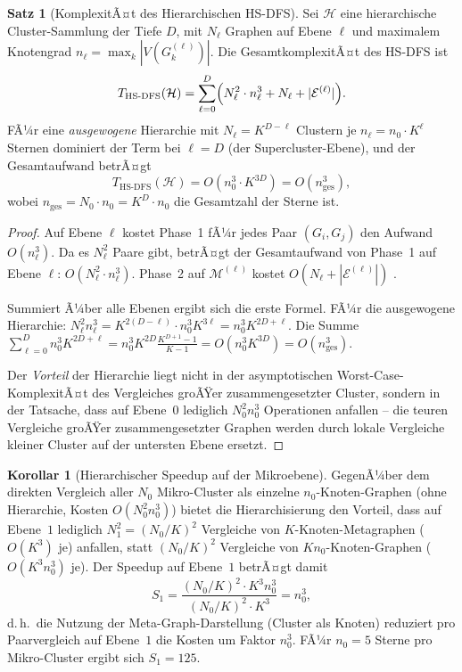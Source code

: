 ﻿\documentclass[a4paper,12pt]{report}
\theoremstyle{definition}
\newtheorem{satz}{Satz}
\newtheorem{korollar}{Korollar}
\begin{document}
\begin{satz}[KomplexitÃ¤t des Hierarchischen HS-DFS]
\label{satz:hsdfs_komplexitaet}
Sei $\mathcal{H}$ eine hierarchische Cluster-Sammlung der Tiefe $D$, mit $N_\ell$ Graphen auf Ebene $\ell$ und maximalem Knotengrad $n_\ell = \max_k |V(G^{(\ell)}_k)|$. Die GesamtkomplexitÃ¤t des HS-DFS ist
\[
T_\mathrm{HS\text{-}DFS}(\mathcal{H}) = \sum_{\ell=0}^{D}
\Bigl( N_\ell^2 \cdot n_\ell^3 + N_\ell + |\mathcal{E}^{(\ell)}| \Bigr).
\]
FÃ¼r eine \emph{ausgewogene} Hierarchie mit $N_\ell = K^{D-\ell}$ Clustern je $n_\ell = n_0 \cdot K^\ell$ Sternen dominiert der Term bei $\ell = D$ (der Supercluster-Ebene), und der Gesamtaufwand betrÃ¤gt
\[
T_\mathrm{HS\text{-}DFS}(\mathcal{H}) = O\!\left(n_0^3 \cdot K^{3D}\right) = O\!\left(n_\mathrm{ges}^3\right),
\]
wobei $n_\mathrm{ges} = N_0 \cdot n_0 = K^D \cdot n_0$ die Gesamtzahl der Sterne ist.
\end{satz}

\begin{proof}
Auf Ebene $\ell$ kostet Phase~1 fÃ¼r jedes Paar $(G_i, G_j)$ den Aufwand $O(n_\ell^3)$. Da es $N_\ell^2$ Paare gibt, betrÃ¤gt der Gesamtaufwand von Phase~1 auf Ebene $\ell$: $O(N_\ell^2 \cdot n_\ell^3)$. Phase~2 auf $\mathcal{M}^{(\ell)}$ kostet $O(N_\ell + |\mathcal{E}^{(\ell)}|)$ \cite{cormen2009}.

Summiert Ã¼ber alle Ebenen ergibt sich die erste Formel. FÃ¼r die ausgewogene Hierarchie: $N_\ell^2 n_\ell^3 = K^{2(D-\ell)} \cdot n_0^3 K^{3\ell} = n_0^3 K^{2D+\ell}$. Die Summe $\sum_{\ell=0}^D n_0^3 K^{2D+\ell} = n_0^3 K^{2D} \frac{K^{D+1}-1}{K-1} = O(n_0^3 K^{3D}) = O(n_\mathrm{ges}^3)$.

Der \emph{Vorteil} der Hierarchie liegt nicht in der asymptotischen Worst-Case-KomplexitÃ¤t des Vergleiches groÃŸer zusammengesetzter Cluster, sondern in der Tatsache, dass auf Ebene~$0$ lediglich $N_0^2 n_0^3$ Operationen anfallen -- die teuren Vergleiche groÃŸer zusammengesetzter Graphen werden durch lokale Vergleiche kleiner Cluster auf der untersten Ebene ersetzt.
\end{proof}

\begin{korollar}[Hierarchischer Speedup auf der Mikroebene]
\label{kor:speedup}
GegenÃ¼ber dem direkten Vergleich aller $N_0$ Mikro-Cluster als einzelne $n_0$-Knoten-Graphen (ohne Hierarchie, Kosten $O(N_0^2 n_0^3)$) bietet die Hierarchisierung den Vorteil, dass auf Ebene~$1$ lediglich $N_1^2 = (N_0/K)^2$ Vergleiche von $K$-Knoten-Metagraphen ($O(K^3)$ je) anfallen, statt $(N_0/K)^2$ Vergleiche von $K n_0$-Knoten-Graphen ($O(K^3 n_0^3)$ je). Der Speedup auf Ebene~$1$ betrÃ¤gt damit
\[
S_1 = \frac{(N_0/K)^2 \cdot K^3 n_0^3}{(N_0/K)^2 \cdot K^3} = n_0^3,
\]
d.\,h.\ die Nutzung der Meta-Graph-Darstellung (Cluster als Knoten) reduziert pro Paarvergleich auf Ebene~$1$ die Kosten um Faktor $n_0^3$. FÃ¼r $n_0 = 5$ Sterne pro Mikro-Cluster ergibt sich $S_1 = 125$.
\end{korollar}
\end{document}

